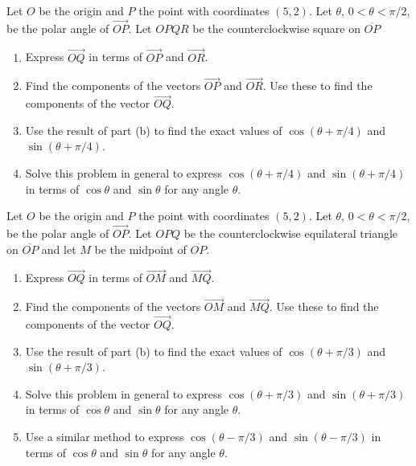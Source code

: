 \documentclass{ximera}
\begin{document}
\begin{example} \label{ex8df83r3r}
Let $O$ be the origin and $P$ the point with coordinates $(5,2)$. Let $\theta$, $0 < \theta < \pi/2$, be the polar angle of $\overrightarrow{OP}$. Let $OPQR$ be the counterclockwise square on $\overline{OP}$

\begin{enumerate}
\item Express $\overrightarrow{OQ}$ in terms of $\overrightarrow{OP}$ and $\overrightarrow{OR}$.

\item Find the components of the vectors $\overrightarrow{OP}$ and $\overrightarrow{OR}$. Use these to find the components of the vector $\overrightarrow{OQ}$.

\item Use the result of part (b) to find the exact values of $\cos(\theta + \pi/4)$ and $\sin(\theta + \pi/4)$.

\item Solve this problem in general to express $\cos(\theta + \pi/4)$ and $\sin(\theta + \pi/4)$ in terms of $\cos\theta$ and $\sin\theta$ for any angle $\theta$.

\end{enumerate}
\end{example}

\begin{example} \label{ex8eef83r3r}
Let $O$ be the origin and $P$ the point with coordinates $(5,2)$. Let $\theta$, $0 < \theta < \pi/2$, be the polar angle of $\overrightarrow{OP}$. Let $OPQ$ be the counterclockwise equilateral triangle on $\overline{OP}$ and let $M$ be the midpoint of $\overline{OP}$.

\begin{enumerate}
\item Express $\overrightarrow{OQ}$ in terms of $\overrightarrow{OM}$ and $\overrightarrow{MQ}$.

\item Find the components of the vectors $\overrightarrow{OM}$ and $\overrightarrow{MQ}$. Use these to find the components of the vector $\overrightarrow{OQ}$.

\item Use the result of part (b) to find the exact values of $\cos(\theta + \pi/3)$ and $\sin(\theta + \pi/3)$.

\item Solve this problem in general to express $\cos(\theta + \pi/3)$ and $\sin(\theta + \pi/3)$ in terms of $\cos\theta$ and $\sin\theta$ for any angle $\theta$.

\item Use a similar method to express $\cos(\theta - \pi/3)$ and $\sin(\theta - \pi/3)$ in terms of $\cos\theta$ and $\sin\theta$ for any angle $\theta$.

\end{enumerate}
\end{example}
\end{document}
